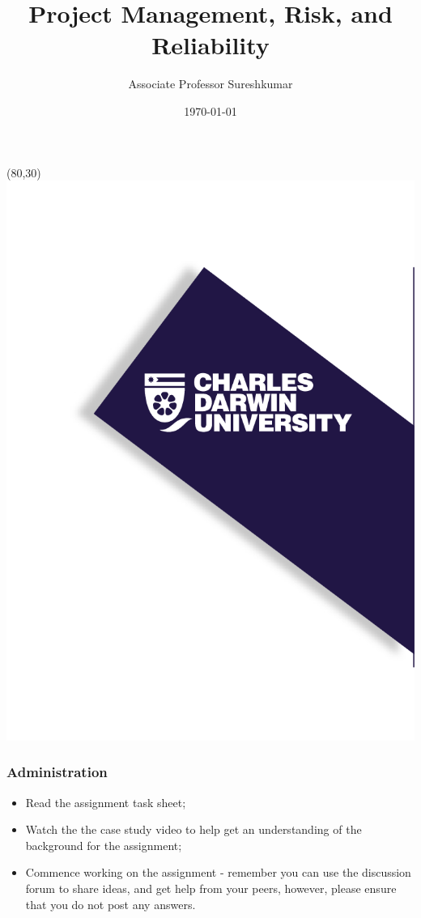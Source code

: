 \documentclass{beamer}
\title[PRT551 - Lecture 2]{Project Management, Risk, and Reliability} %
\author{Associate Professor Sureshkumar} %
\institute[CDU] %
{
Charles Darwin University \\ %
\medskip
\textit{@cdu.edu.au} %
}
\date{\today} %
\begin{document}
\begin{frame}
\titlepage %
\begin{textblock}{20}(80,30)
      \includegraphics[scale=0.8]{logo_1.png}
\end{textblock}
\end{frame}




\begin{frame}
\frametitle{Administration}
\begin{itemize}
\item Read the assignment task sheet;
\item Watch the the case study video to help get an understanding of the background for the assignment;
\item Commence working on the assignment - remember you can use the discussion forum to share ideas, and get help from your peers, however, please ensure that you do not post any answers.
\end{itemize}
\end{frame}
\end{document}
